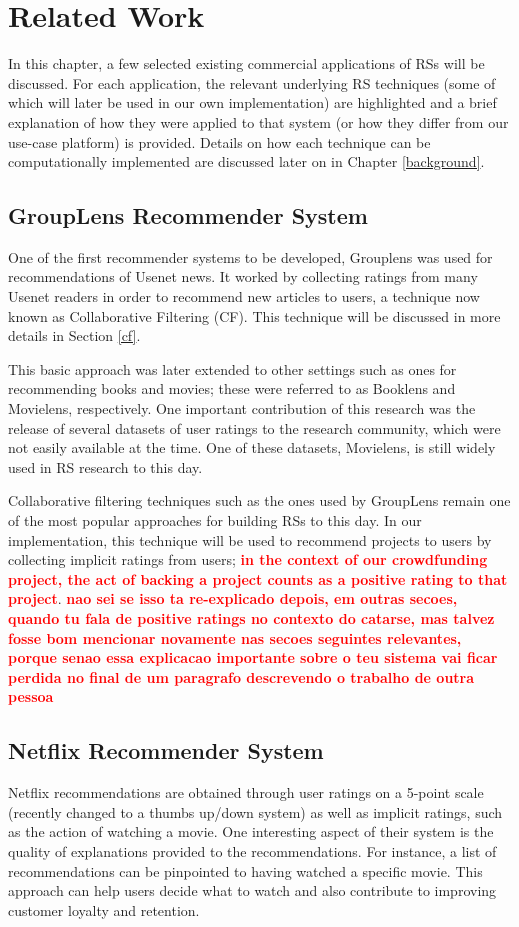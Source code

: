 \documentclass[cic,tc,english]{iiufrgs}
\newcommand{\bruno}[1]{\textcolor{red}{\textbf{#1}}}
\begin{document}
\chapter{Related Work} \label{related-work}

In this chapter, a few selected existing commercial applications of RSs will be discussed. For each application, the relevant underlying RS techniques (some of which will later be used in our own implementation) are highlighted and a brief explanation of how they were applied to that system (or how they differ from our use-case platform) is provided. Details on how each technique can be computationally implemented are discussed later on in Chapter \ref{background}.

\section{GroupLens Recommender System}
One of the first recommender systems to be developed, Grouplens \cite{N.N2010} was used for recommendations of Usenet news. It worked by collecting ratings from many Usenet readers in order to recommend new articles to users, a technique now known as Collaborative Filtering (CF). This technique will be discussed in more details in Section \ref{cf}.

This basic approach was later extended to other settings such as ones for recommending books and movies; these were referred to as Booklens and Movielens, respectively. One important contribution of this research was the release of several datasets of user ratings to the research community, which were not easily available at the time. One of these datasets, Movielens, is still widely used in RS research to this day.

Collaborative filtering techniques such as the ones used by GroupLens remain one of the most popular approaches for building RSs to this day. In our implementation, this technique will be used to recommend projects to users by collecting implicit ratings from users; \bruno{in the context of our crowdfunding project, the act of backing a project counts as a positive rating to that project}. \bruno{nao sei se isso ta re-explicado depois, em outras secoes, quando tu fala de positive ratings no contexto do catarse, mas talvez fosse bom mencionar novamente nas secoes seguintes relevantes, porque senao essa explicacao importante sobre o teu sistema vai ficar perdida no final de um paragrafo descrevendo o trabalho de outra pessoa}

\section{Netflix Recommender System}
Netflix recommendations are obtained through user ratings on a 5-point scale (recently changed to a thumbs up/down system) as well as implicit ratings, such as the action of watching a movie. One interesting aspect of their system is the quality of explanations provided to the recommendations. For instance, a list of recommendations can be pinpointed to having watched a specific movie. This approach can help users decide what to watch and also contribute to improving customer loyalty and retention.
\end{document}
